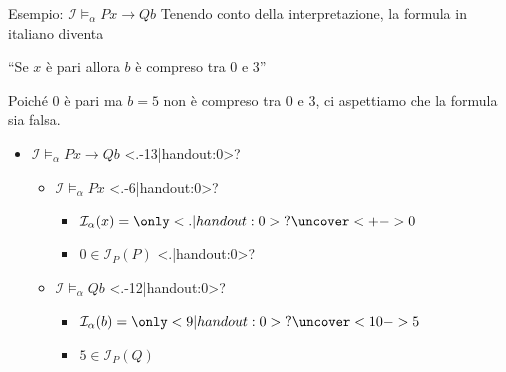 \documentclass[aspectratio=169,10pt,dvipsnames,xcolor=table,handout]{beamer}
\newcommand{\mcI}{\mathcal{I}}
\begin{document}
\begin{frame}{Esempio: $\mcI \models_\alpha Px \to Qb$}
    Tenendo conto della interpretazione, la formula in italiano diventa
    \begin{center}
        ``Se $x$ è pari allora $b$ è compreso tra $0$ e $3$''
    \end{center}
    Poiché $0$ è pari ma $b = 5$ non è compreso tra $0$ e $3$, ci aspettiamo che la formula sia falsa.

    \medskip
    \begin{itemize}[<+->]
        \item $\mcI \models_\alpha Px \to Qb$ \only<.-13|handout:0>{?}
        \begin{itemize}
            \item $\mcI \models_\alpha Px$  \only<.-6|handout:0>{?}
            \begin{itemize}
                \item $\mcI_\alpha(x) = {}\only<.|handout:0>{?}\uncover<+->{0}$
                \item $0 \in \mcI_P(P)$ \only<.|handout:0>{?}
            \end{itemize}
            \item<8-> $\mcI \models_\alpha Qb$ \only<.-12|handout:0>{?}
            \begin{itemize}
                \item<9-> $\mcI_\alpha(b) = {}\only<9|handout:0>{?}\uncover<10->{5}$
                \item<11-> $5 \in \mcI_P(Q)$ 
            \end{itemize}
        \end{itemize}
    \end{itemize}
\end{frame}
\end{document}
